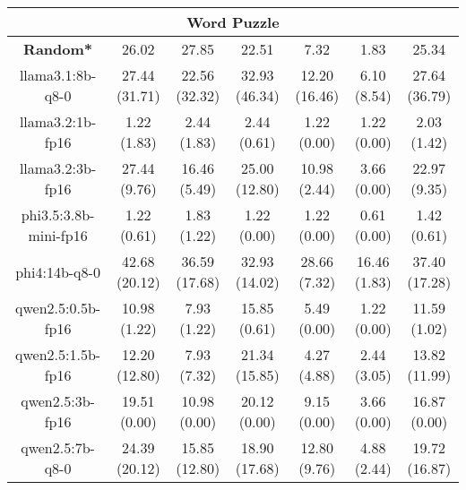\begin{table}[hbp]
{\begin{tabular}{ccccccc}
      \hline
      \multicolumn{7}{c}{Word Puzzle} \\ \hline
      \multicolumn{1}{c|}{\textbf{Random*}} & 26.02 & 27.85 & \multicolumn{1}{c|}{22.51} & 7.32 & \multicolumn{1}{c|}{1.83} & 25.34 \\ \hline

      \multicolumn{1}{c|}{llama3.1:8b-q8-0} & 27.44 (31.71) & 22.56 (32.32) & \multicolumn{1}{c|}{32.93 (46.34)} & 12.20 (16.46) & \multicolumn{1}{c|}{6.10 (8.54)} & 27.64 (36.79) \\

      \multicolumn{1}{c|}{llama3.2:1b-fp16} & 1.22 (1.83) & 2.44 (1.83) & \multicolumn{1}{c|}{2.44 (0.61)} & 1.22 (0.00) & \multicolumn{1}{c|}{1.22 (0.00)} & 2.03 (1.42) \\

      \multicolumn{1}{c|}{llama3.2:3b-fp16} & 27.44 (9.76) & 16.46 (5.49) & \multicolumn{1}{c|}{25.00 (12.80)} & 10.98 (2.44) & \multicolumn{1}{c|}{3.66 (0.00)} & 22.97 (9.35) \\

      \multicolumn{1}{c|}{phi3.5:3.8b-mini-fp16} & 1.22 (0.61) & 1.83 (1.22) & \multicolumn{1}{c|}{1.22 (0.00)} & 1.22 (0.00) & \multicolumn{1}{c|}{0.61 (0.00)} & 1.42 (0.61) \\

      \multicolumn{1}{c|}{phi4:14b-q8-0} & 42.68 (20.12) & 36.59 (17.68) & \multicolumn{1}{c|}{32.93 (14.02)} & 28.66 (7.32) & \multicolumn{1}{c|}{16.46 (1.83)} & 37.40 (17.28) \\

      \multicolumn{1}{c|}{qwen2.5:0.5b-fp16} & 10.98 (1.22) & 7.93 (1.22) & \multicolumn{1}{c|}{15.85 (0.61)} & 5.49 (0.00) & \multicolumn{1}{c|}{1.22 (0.00)} & 11.59 (1.02) \\

      \multicolumn{1}{c|}{qwen2.5:1.5b-fp16} & 12.20 (12.80) & 7.93 (7.32) & \multicolumn{1}{c|}{21.34 (15.85)} & 4.27 (4.88) & \multicolumn{1}{c|}{2.44 (3.05)} & 13.82 (11.99) \\

      \multicolumn{1}{c|}{qwen2.5:3b-fp16} & 19.51 (0.00) & 10.98 (0.00) & \multicolumn{1}{c|}{20.12 (0.00)} & 9.15 (0.00) & \multicolumn{1}{c|}{3.66 (0.00)} & 16.87 (0.00) \\

      \multicolumn{1}{c|}{qwen2.5:7b-q8-0} & 24.39 (20.12) & 15.85 (12.80) & \multicolumn{1}{c|}{18.90 (17.68)} & 12.80 (9.76) & \multicolumn{1}{c|}{4.88 (2.44)} & 19.72 (16.87) \\


\end{tabular}}
\end{table}
